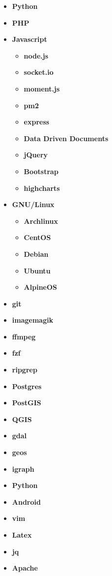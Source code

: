 \begin{itemize}
\begin{itemize}
    \end{itemize}
  \item \textbf{Python}
  \item \textbf{PHP}
  \item \textbf{Javascript}
    \begin{itemize}
      \item \textbf{node.js}
      \item \textbf{socket.io}
      \item \textbf{moment.js}
      \item \textbf{pm2}
      \item \textbf{express}
      \item \textbf{Data Driven Documents}
      \item \textbf{jQuery}
      \item \textbf{Bootstrap}
      \item \textbf{highcharts}
    \end{itemize}
  \item \textbf{GNU/Linux}
    \begin{itemize}
      \item \textbf{Archlinux}
      \item \textbf{CentOS}
      \item \textbf{Debian}
      \item \textbf{Ubuntu}
      \item \textbf{AlpineOS}
    \end{itemize}
  \item \textbf{git}
  \item \textbf{imagemagik}
  \item \textbf{ffmpeg}
  \item \textbf{fzf}
  \item \textbf{ripgrep}
  \item \textbf{Postgres}
  \item \textbf{PostGIS}
  \item \textbf{QGIS}
  \item \textbf{gdal}
  \item \textbf{geos}
  \item \textbf{igraph}
  \item \textbf{Python}
  \item \textbf{Android }
  \item \textbf{vim}
  \item \textbf{Latex}
  \item \textbf{jq}
  \item \textbf{Apache}

\end{itemize}
